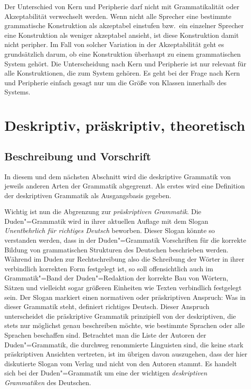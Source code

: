 
Der Unterschied von Kern und Peripherie darf nicht mit Grammatikalität oder Akzeptabilität verwechselt werden.
Wenn nicht alle Sprecher eine bestimmte grammatische Konstruktion als akzeptabel einstufen bzw.\ ein einzelner Sprecher eine Konstruktion als weniger akzeptabel ansieht, ist diese Konstruktion damit nicht peripher.
Im Fall von solcher Variation in der Akzeptabilität geht es grundsätzlich darum, ob eine Konstruktion überhaupt zu einem grammatischen System gehört.
Die Unterscheidung nach Kern und Peripherie ist nur relevant für alle Konstruktionen, die zum System gehören.
Es geht bei der Frage nach Kern und Peripherie einfach gesagt nur um die Größe von Klassen innerhalb des Systems.

\section{Deskriptiv, präskriptiv, theoretisch}

\label{sec:deskriptivnormativ}

\subsection{Beschreibung und Vorschrift}

In diesem und dem nächsten Abschnitt wird die deskriptive Grammatik von jeweils anderen Arten der Grammatik abgegrenzt.
Als erstes wird eine Definition der deskriptiven Grammatik als Ausgangsbasis gegeben.


Wichtig ist nun die Abgrenzung zur \textit{präskriptiven Grammatik}.
Die Duden"=Grammatik \citep{Duden8} wird in ihrer aktuellen Auflage mit dem Slogan \textit{Unentbehrlich für richtiges Deutsch} beworben.
Dieser Slogan könnte so verstanden werden, dass in der Duden"=Grammatik Vorschriften für die korrekte Bildung von grammatischen Strukturen des Deutschen beschrieben werden.
Während im Duden zur Rechtschreibung also die Schreibung der Wörter in ihrer verbindlich korrekten Form festgelegt ist, so soll offensichtlich auch im Grammatik"=Band der Duden"=Redaktion der korrekte Bau von Wörtern, Sätzen und vielleicht sogar größeren Einheiten wie Texten verbindlich festgelegt sein.
Der Slogan markiert einen normativen oder präskriptiven Anspruch:
Was in dieser Grammatik steht, definiert richtiges Deutsch.
Dieser Anspruch unterscheidet die präskriptive Grammatik prinzipiell von der deskriptiven, die stets nur möglichst genau beschreiben möchte, wie bestimmte Sprachen oder alle Sprachen beschaffen sind.
Betrachtet man die Liste der Autoren der Duden"=Grammatik, die durchweg renommierte Linguisten sind, die keine stark präskriptiven Ansichten vertreten, ist im übrigen davon auszugehen, dass der hier diskutierte Slogan vom Verlag und nicht von den Autoren stammt. 
Es handelt sich bei der Duden"=Grammatik um eine der wichtigen \textit{deskriptiven Grammatiken} des Deutschen.

